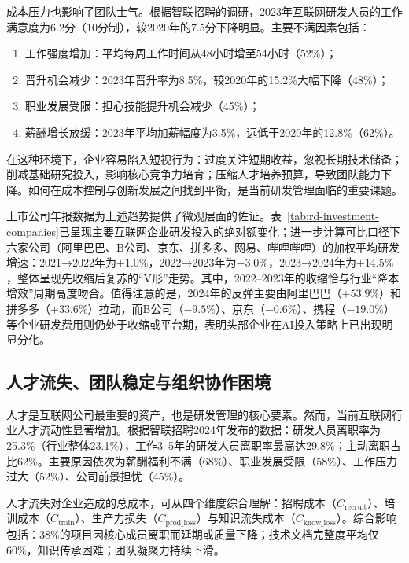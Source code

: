 成本压力也影响了团队士气。根据智联招聘的调研，2023年互联网研发人员的工作满意度为6.2分（10分制），较2020年的7.5分下降明显。主要不满因素包括：
\begin{enumerate}
\item 工作强度增加：平均每周工作时间从48小时增至54小时（52\%）；
\item 晋升机会减少：2023年晋升率为8.5\%，较2020年的15.2\%大幅下降（48\%）；
\item 职业发展受限：担心技能提升机会减少（45\%）；
\item 薪酬增长放缓：2023年平均加薪幅度为3.5\%，远低于2020年的12.8\%（62\%）\cite{zhaopin2024tech}。
\end{enumerate}

在这种环境下，企业容易陷入短视行为：过度关注短期收益，忽视长期技术储备；削减基础研究投入，影响核心竞争力培育；压缩人才培养预算，导致团队能力下降。如何在成本控制与创新发展之间找到平衡，是当前研发管理面临的重要课题。

上市公司年报数据为上述趋势提供了微观层面的佐证。表~\ref{tab:rd-investment-companies}已呈现主要互联网企业研发投入的绝对额变化；进一步计算可比口径下六家公司（阿里巴巴、B公司、京东、拼多多、网易、哔哩哔哩）的加权平均研发增速：2021→2022年为$+1.0\%$，2022→2023年为$-3.0\%$，2023→2024年为$+14.5\%$，整体呈现先收缩后复苏的“V形”走势。其中，2022--2023年的收缩恰与行业“降本增效”周期高度吻合。值得注意的是，2024年的反弹主要由阿里巴巴（$+53.9\%$）和拼多多（$+33.6\%$）拉动，而B公司（$-9.5\%$）、京东（$-0.6\%$）、携程（$-19.0\%$）等企业研发费用则仍处于收缩或平台期，表明头部企业在AI投入策略上已出现明显分化。

\subsection{人才流失、团队稳定与组织协作困境}

人才是互联网公司最重要的资产，也是研发管理的核心要素\cite{tang2022motivation,xu2024theoretical}。然而，当前互联网行业人才流动性显著增加。根据智联招聘2024年发布的数据\cite{zhaopin2024tech}：研发人员离职率为25.3\%（行业整体23.1\%），工作3--5年的研发人员离职率最高达29.8\%；主动离职占比62\%。主要原因依次为薪酬福利不满（68\%）、职业发展受限（58\%）、工作压力过大（52\%）、公司前景担忧（45\%）。

人才流失对企业造成的总成本，可从四个维度综合理解：招聘成本（$C_{\mathrm{recruit}}$）、培训成本（$C_{\mathrm{train}}$）、生产力损失（$C_{\mathrm{prod\_loss}}$）与知识流失成本（$C_{\mathrm{know\_loss}}$）\cite{mckinsey2023tech}。综合影响包括：38\%的项目因核心成员离职而延期或质量下降；技术文档完整度平均仅60\%，知识传承困难；团队凝聚力持续下滑。

